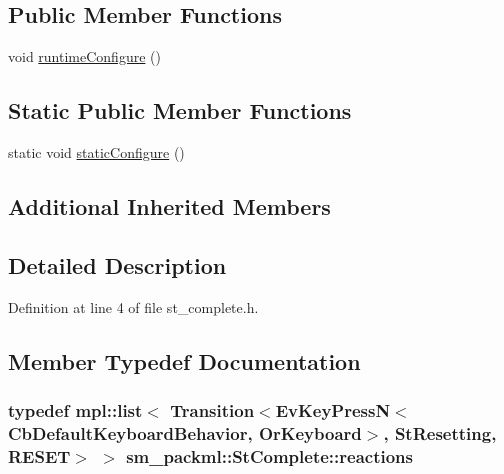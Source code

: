 \subsection*{Public Member Functions}
\begin{DoxyCompactItemize}
\item 
void \hyperlink{structsm__packml_1_1StComplete_af6884149d83d202713c31c0aa85fa9e2}{runtime\+Configure} ()
\end{DoxyCompactItemize}
\subsection*{Static Public Member Functions}
\begin{DoxyCompactItemize}
\item 
static void \hyperlink{structsm__packml_1_1StComplete_a6d671966b0f05fc72d1662054a32ecd3}{static\+Configure} ()
\end{DoxyCompactItemize}
\subsection*{Additional Inherited Members}


\subsection{Detailed Description}


Definition at line 4 of file st\+\_\+complete.\+h.



\subsection{Member Typedef Documentation}
\subsubsection[{\texorpdfstring{reactions}{reactions}}]{\setlength{\rightskip}{0pt plus 5cm}typedef mpl\+::list$<$ Transition$<$Ev\+Key\+PressN$<$Cb\+Default\+Keyboard\+Behavior, {\bf Or\+Keyboard}$>$, {\bf St\+Resetting}, {\bf R\+E\+S\+ET}$>$ $>$ {\bf sm\+\_\+packml\+::\+St\+Complete\+::reactions}}\hypertarget{structsm__packml_1_1StComplete_abe26a003ec05b72f290f6b5c2497123e}{}\label{structsm__packml_1_1StComplete_abe26a003ec05b72f290f6b5c2497123e}


